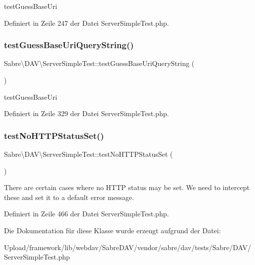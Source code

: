 test\+Guess\+Base\+Uri 

Definiert in Zeile 247 der Datei Server\+Simple\+Test.\+php.

\mbox{\label{class_sabre_1_1_d_a_v_1_1_server_simple_test_a50c74dc453685f15e8c1b20c06362bf6}} 
\subsubsection{\texorpdfstring{test\+Guess\+Base\+Uri\+Query\+String()}{testGuessBaseUriQueryString()}}
{\footnotesize\ttfamily Sabre\textbackslash{}\+D\+A\+V\textbackslash{}\+Server\+Simple\+Test\+::test\+Guess\+Base\+Uri\+Query\+String (\begin{DoxyParamCaption}{ }\end{DoxyParamCaption})}

test\+Guess\+Base\+Uri 

Definiert in Zeile 329 der Datei Server\+Simple\+Test.\+php.

\mbox{\label{class_sabre_1_1_d_a_v_1_1_server_simple_test_ad61954ab12b196097e841182a74ef78d}} 
\subsubsection{\texorpdfstring{test\+No\+H\+T\+T\+P\+Status\+Set()}{testNoHTTPStatusSet()}}
{\footnotesize\ttfamily Sabre\textbackslash{}\+D\+A\+V\textbackslash{}\+Server\+Simple\+Test\+::test\+No\+H\+T\+T\+P\+Status\+Set (\begin{DoxyParamCaption}{ }\end{DoxyParamCaption})}

There are certain cases where no H\+T\+TP status may be set. We need to intercept these and set it to a default error message. 

Definiert in Zeile 466 der Datei Server\+Simple\+Test.\+php.



Die Dokumentation für diese Klasse wurde erzeugt aufgrund der Datei\+:\begin{DoxyCompactItemize}
\item 
Upload/framework/lib/webdav/\+Sabre\+D\+A\+V/vendor/sabre/dav/tests/\+Sabre/\+D\+A\+V/Server\+Simple\+Test.\+php\end{DoxyCompactItemize}
